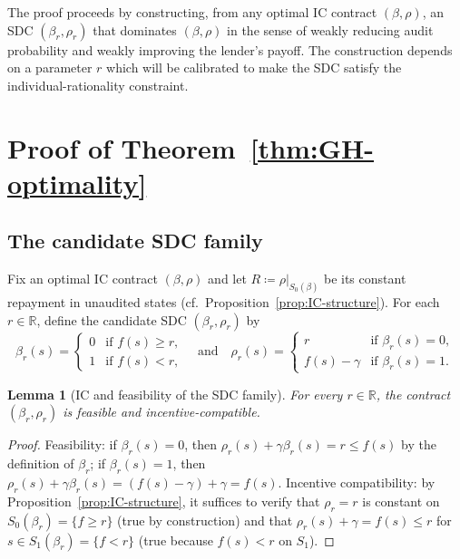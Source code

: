 \documentclass[11pt,a4paper,oneside]{book}
\def\R{\mathbb{R}}
\def\leq{\leqslant}
\def\geq{\geqslant}
\def\et{\quad \text{and} \quad}
\theoremstyle{plain}
\newtheorem{lemma}[theorem]{Lemma}
\theoremstyle{definition}
\theoremstyle{remark}
\numberwithin{equation}{chapter}
\begin{document}
The proof proceeds by constructing, from any optimal IC contract $(\beta, \rho)$, an SDC $(\beta_r, \rho_r)$ that dominates $(\beta, \rho)$ in the sense of weakly reducing audit probability and weakly improving the lender's payoff.
The construction depends on a parameter $r$ which will be calibrated to make the SDC satisfy the individual-rationality constraint.

\section{Proof of Theorem~\ref{thm:GH-optimality}}
\label{sec:GH-proof}

\subsection{The candidate SDC family}

Fix an optimal IC contract $(\beta, \rho)$ and let $R \coloneqq \rho|_{S_0(\beta)}$ be its constant repayment in unaudited states (cf.\ Proposition~\ref{prop:IC-structure}).
For each $r \in \R$, define the candidate SDC $(\beta_r, \rho_r)$ by
\begin{equation}\label{eq:SDC-candidate}
  \beta_r(s) = \begin{cases} 0 & \text{if } f(s) \geq r, \\ 1 & \text{if } f(s) < r, \end{cases}
  \et
  \rho_r(s) = \begin{cases} r & \text{if } \beta_r(s) = 0, \\ f(s) - \gamma & \text{if } \beta_r(s) = 1. \end{cases}
\end{equation}

\begin{lemma}[IC and feasibility of the SDC family]\label{lem:SDC-feasible-IC}
For every $r \in \R$, the contract $(\beta_r, \rho_r)$ is feasible and incentive-compatible.
\end{lemma}

\begin{proof}
Feasibility: if $\beta_r(s) = 0$, then $\rho_r(s) + \gamma \beta_r(s) = r \leq f(s)$ by the definition of $\beta_r$; if $\beta_r(s) = 1$, then $\rho_r(s) + \gamma \beta_r(s) = (f(s) - \gamma) + \gamma = f(s)$.
Incentive compatibility: by Proposition~\ref{prop:IC-structure}, it suffices to verify that $\rho_r = r$ is constant on $S_0(\beta_r) = \{ f \geq r \}$ (true by construction) and that $\rho_r(s) + \gamma = f(s) \leq r$ for $s \in S_1(\beta_r) = \{ f < r \}$ (true because $f(s) < r$ on $S_1$).
\end{proof}
\end{document}
